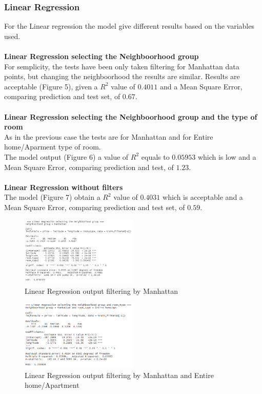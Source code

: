 \documentclass{FR16}
\begin{document}
\subsubsection{Linear Regression}
For the Linear regression the model give different results based on the variables used. \\\\
\textbf{Linear Regression selecting the Neighboorhood group}\\
For semplicity, the tests have been only taken filtering for Manhattan data points, but changing the neighboorhood the results are similar. 
Results are acceptable (Figure 5), given a $R^2$ value of $0.4011$ and a Mean Square Error, comparing prediction and test set, of $0.67$.
\\\\ \textbf{Linear Regression selecting the Neighboorhood group and the type of room}\\
As in the previous case the tests are for Manhattan and for Entire home/Aparment type of room.\\
The model output (Figure 6) a value of $R^2$ equals to $ 0.05953$ which is low  and a Mean Square Error, comparing prediction and test, of $1.23$.
\\\\ \textbf{Linear Regression without filters}\\
The model (Figure 7) obtain a $R^2$ value of $0.4031$ which is acceptable and a Mean Square Error, comparing prediction and test set, of $ 0.59$.
\begin{figure}[H]
\centering
\includegraphics[width=0.5\textwidth]{figures/lm2.PNG} 
\caption{\label{fig:6}  Linear Regression output filtering by  Manhattan}
\end{figure}
\begin{figure}[H]
\centering
\includegraphics[width=0.5\textwidth]{figures/lm3.PNG} 
\caption{\label{fig:7}  Linear Regression output filtering by  Manhattan and Entire home/Apartment }
\end{figure}
\end{document}
